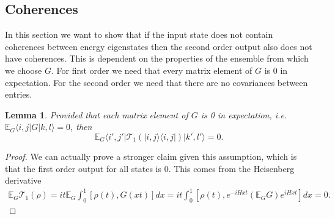 \documentclass[
 amsmath,amssymb,
 aps,
onecolumn, 
nofootinbib]{revtex4-2}
\newtheorem{lemma}[theorem]{Lemma}
\newcommand{\ket}[1]{|#1\rangle}
\newcommand{\bra}[1]{\langle #1|}
\newcommand{\ketbra}[2]{| #1\rangle\! \langle #2|}
\newcommand{\EE}{\mathbb{E}}
\begin{document}
\subsection{Coherences} \label{sec:coherences}
In this section we want to show that if the input state does not contain coherences between energy eigenstates then the second order output also does not have coherences. This is dependent on the properties of the ensemble from which we choose $G$. For first order we need that every matrix element of $G$ is 0 in expectation. For the second order we need that there are no covariances between entries. 

\begin{lemma}
    Provided that each matrix element of $G$ is 0 in expectation, i.e. $\EE_G \bra{i,j} G \ket{k,l} = 0$, then 
    \begin{equation}
        \EE_G \bra{i',j'} \mathcal{T}_1 (\ketbra{i,j}{i,j}) \ket{k',l'} = 0.
    \end{equation}
\end{lemma}
\begin{proof}
    We can actually prove a stronger claim given this assumption, which is that the first order output for all states is 0. This comes from the Heisenberg derivative 
    \begin{align}
        \EE_G \mathcal{T}_1(\rho) = i t \EE_G \int_0^1 [\rho(t), G(xt)] dx = i t \int_0^1 [\rho(t), e^{-i H x t} (\EE_G G ) e^{i H x t}] dx = 0.
    \end{align}
\end{proof}
\end{document}

